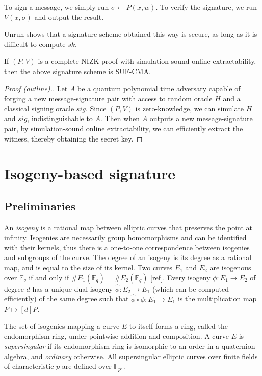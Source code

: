 \documentclass[runningheads,a4paper]{llncs}
\begin{document}
To sign a message, we simply run $\sigma \leftarrow P(x,w)$. To verify the signature, we run $V(x,\sigma)$ and output the result.

Unruh shows that a signature scheme obtained this way is secure, as long as it is difficult to compute $sk$.

\begin{theorem}
If $(P,V)$ is a complete NIZK proof with simulation-sound online extractability, then the above signature scheme is SUF-CMA.
\end{theorem}
\begin{proof}[Proof (outline).]
Let $A$ be a quantum polynomial time adversary capable of forging a new message-signature pair with access to random oracle $H$ and a classical signing oracle $sig$. Since $(P,V)$ is zero-knowledge, we can simulate $H$ and $sig$, indistinguishable to $A$. Then when $A$ outputs a new message-signature pair, by simulation-sound online extractability, we can efficiently extract the witness, thereby obtaining the secret key.
\end{proof}










\section{Isogeny-based signature}
\subsection{Preliminaries}
An \emph{isogeny} is a rational map between elliptic curves that preserves the point at infinity. Isogenies are necessarily group homomorphisms and can be identified with their kernels, thus there is a one-to-one correspondence between isogenies and subgroups of the curve. The degree of an isogeny is its degree as a rational map, and is equal to the size of its kernel. Two curves $E_1$ and $E_2$ are isogenous over $\mathbb{F}_q$ if and only if $\#E_1(\mathbb{F}_q) = \#E_2(\mathbb{F}_q)$ [ref]. Every isogeny $\phi: E_1 \to E_2$ of degree $d$ has a unique dual isogeny $\hat \phi:E_2 \to E_1$ (which can be computed efficiently) of the same degree such that $\hat \phi \circ \phi : E_1 \to E_1$ is the multiplication map $P \mapsto [d]P$.

The set of isogenies mapping a curve $E$ to itself forms a ring, called the endomorphism ring, under pointwise addition and composition. A curve $E$ is \emph{supersingular} if its endomorphism ring is isomorphic to an order in a quaternion algebra, and \emph{ordinary} otherwise. All supersingular elliptic curves over finite fields of characteristic $p$ are defined over $\mathbb{F}_{p^2}$.
\end{document}
